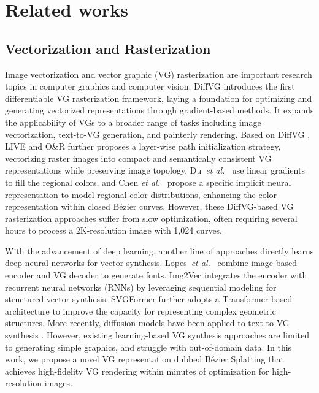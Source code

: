 \vspace{-.5em}
\section{Related works}

\label{sec:related_works}

\vspace{-.5em}
\subsection{Vectorization and Rasterization}
\vspace{-.5em}

Image vectorization and vector graphic (VG) rasterization are important research topics in computer graphics and computer vision. DiffVG \cite{Li:2020:DVG} introduces the first differentiable VG rasterization framework, laying a foundation for optimizing and generating vectorized representations through gradient-based methods. It expands the applicability of VGs to a broader range of tasks including image vectorization, text-to-VG generation, and painterly rendering. Based on DiffVG \cite{Li:2020:DVG}, LIVE \cite{xu2022live} and O\&R \cite{hirschorn2024optimize} further proposes a layer-wise path initialization strategy, vectorizing raster images into compact and semantically consistent VG representations while preserving image topology. Du~\emph{et al.}~\cite{Du:2023:IVE} use linear gradients to fill the regional colors, and Chen \emph{et al.}~\cite{Chen_2024_CVPR} propose a specific implicit neural representation to model regional color distributions, enhancing the color representation within closed Bézier curves. However, these DiffVG-based VG rasterization approaches \cite{Li:2020:DVG, xu2022live, Du:2023:IVE, Chen_2024_CVPR} suffer from slow optimization, often requiring several hours to process a 2K-resolution image with 1,024 curves. 

With the advancement of deep learning, another line of approaches directly learns deep neural networks for vector synthesis.
Lopes~\emph{et al.}~\cite{lopes2019learned} combine image-based encoder and VG decoder to generate fonts. Img2Vec \cite{reddy2021im2vec} integrates the encoder with recurrent neural networks (RNNs) by leveraging sequential modeling for structured vector synthesis. SVGFormer \cite{Cao_2023_CVPR} further adopts a Transformer-based architecture \cite{vaswani2017attention} to improve the capacity for representing complex geometric structures. More recently, diffusion models \cite{ho2020denoising} have been applied to text-to-VG synthesis \cite{zhang2024text, jain2023vectorfusion, xing2024svgdreamer, xing2023diffsketcher}. However, existing learning-based VG synthesis approaches are limited to generating simple graphics, and struggle with out-of-domain data. In this work, we propose a novel VG representation dubbed Bézier Splatting that achieves high-fidelity VG rendering within minutes of optimization for high-resolution images.


